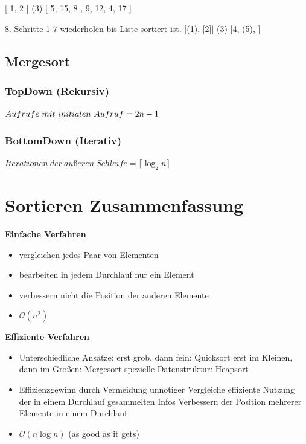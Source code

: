 \documentclass[12pt]{article}
\begin{document}
\begin{center}
	[ 1, 2 ] (3) [ 5, 15, 8 , 9, 12, 4, 17 ]
\end{center}

8. Schritte 1-7 wiederholen bis Liste sortiert ist.
	[(1),  [2]] (3) [4, (5), ]
\newpage

\subsection{Mergesort}
\subsubsection{TopDown (Rekursiv)}
\begin{center}
	$Aufrufe \ mit \ initialen \ Aufruf = \Large{2n-1}$
\end{center}

\subsubsection{BottomDown (Iterativ)}
\begin{center}
	$Iterationen \ der \ \ddot{a}ußeren \ Schleife =  \lceil \log_{2} n \rceil $
\end{center}
\newpage

\section{Sortieren Zusammenfassung}

\textbf{Einfache Verfahren}

\begin{itemize}
	\item vergleichen jedes Paar von Elementen
 	\item bearbeiten in jedem Durchlauf nur ein Element
	 \item verbessern nicht die Position der anderen Elemente
	\item $ \mathcal{O}(n^2) $ 
\end{itemize}
\textbf{Effiziente Verfahren}
\begin{itemize}
	\item Unterschiedliche Ansatze: 
	\subitem erst grob, dann fein: Quicksort
	\subitem erst im Kleinen, dann im Großen: Mergesort
	\subitem spezielle Datenstruktur: Heapsort
	\item Effizienzgewinn durch
	\subitem Vermeidung unnotiger Vergleiche
	\subitem effiziente Nutzung der in einem Durchlauf gesammelten Infos
	\subitem Verbessern der Position mehrerer Elemente in einem Durchlauf
	\item $ \mathcal{O}(n\log n) $  (as good as it gets)
\end{itemize}
\end{document}
